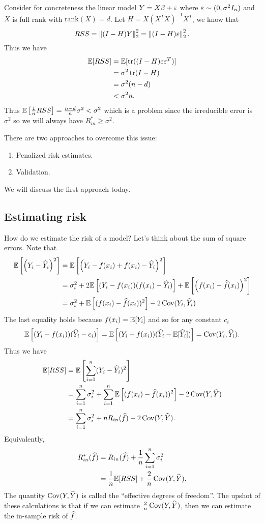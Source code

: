 \begin{ex}
    Consider for concreteness the linear model $Y=X\beta + \varepsilon$ where $\varepsilon \sim (0, \sigma^2I_n)$ and $X$ is full rank with $\text{rank}(X) = d$. Let $H=X(X^TX)^{-1}X^T$, we know that \[RSS = \left\|(I-H)Y\right\|_2^2 = \left\|(I-H)\varepsilon\right\|_2^2.\] Thus we have 
    \begin{align*}
        {\mathbb{E}}[RSS] &= {\mathbb{E}}[\operatorname*{tr}((I-H)\varepsilon\varepsilon^T)]\\
        &=\sigma^2\operatorname*{tr}(I-H)\\
        &=\sigma^2(n-d)\\
        &< \sigma^2 n.
    \end{align*}
    Thus ${\mathbb{E}}\left[\frac{1}{n}RSS\right] = \frac{n-d}{n}\sigma^2 < \sigma^2$ which is a problem since the irreducible error is $\sigma^2$ so we will always have $R_{in}^* \ge \sigma^2$.
\end{ex}
There are two approaches to overcome this issue:
\begin{enumerate}
    \item Penalized risk estimates.
    \item Validation.
\end{enumerate}
We will discuss the first approach today.

\subsection{Estimating risk}
How do we estimate the risk of a model? Let's think about the sum of square errors. Note that
\begin{align*}
    {\mathbb{E}}\left[\left(Y_i-\widehat{Y}_i\right)^2\right]&={\mathbb{E}}\left[\left(Y_i-f(x_i)+f(x_i)-\widehat{Y}_i\right)^2\right]\\
    &=\sigma_i^2+2{\mathbb{E}}\left[(Y_i-f(x_i))(f(x_i)-\widehat{Y}_i)\right]+{\mathbb{E}}\left[\left(f(x_i)-\widehat{f}(x_i)\right)^2\right]\\
    &=\sigma_i^2+{\mathbb{E}}\left[(f(x_i)-\widehat{f}(x_i))^2\right]-2\operatorname*{Cov}(Y_i,\widehat{Y}_i)
\end{align*}
The last equality holds because $f(x_i) = {\mathbb{E}}[Y_i]$ and so for any constant $c_i$
\[{\mathbb{E}}\left[(Y_i-f(x_i))(\widehat{Y}_i-c_i)\right] = {\mathbb{E}}\left[(Y_i-f(x_i))(\widehat{Y}_i-{\mathbb{E}}[\widehat{Y}_i])\right] =\operatorname*{Cov}(Y_i,\widehat{Y}_i).\]
Thus we have 
\begin{align*}
    {\mathbb{E}}[RSS] &= {\mathbb{E}}\left[\sum_{i=1}^n (Y_i-\widehat{Y}_i)^2\right]\\
    &=\sum_{i=1}^n \sigma^2_i + \sum_{i=1}^n{\mathbb{E}}\left[(f(x_i)-\widehat{f}(x_i))^2\right]-2\operatorname*{Cov}(Y,\widehat{Y}) \\
    &=\sum_{i=1}^n \sigma^2_i + nR_{in}(\widehat{f})-2\operatorname*{Cov}(Y,\widehat{Y}).
\end{align*}
Equivalently,
\begin{align*}
    R^*_{in}(\widehat{f})&=R_{in}(\widehat{f})+\frac{1}{n}\sum_{i=1}^n \sigma_i^2\\
    &= \frac{1}{n}{\mathbb{E}}[RSS]+\frac{2}{n}\operatorname*{Cov}(Y,\widehat{Y}).
\end{align*}
The quantity $\operatorname*{Cov}(Y,\widehat{Y})$ is called the ``effective degrees of freedom''. The upshot of these calculations is that if we can estimate $\frac{2}{n}\operatorname*{Cov}(Y,\widehat{Y})$, then we can estimate the in-sample risk of $\widehat{f}$. 

